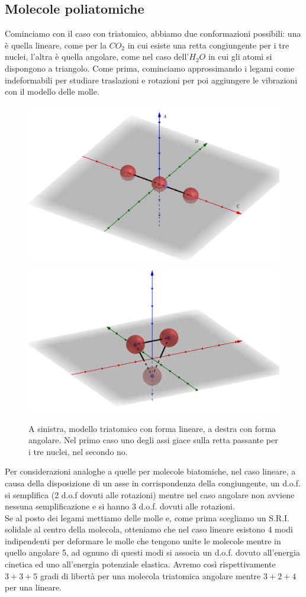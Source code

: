 \documentclass[
10pt, %
a4paper, %
oneside, %
headinclude,footinclude, %
BCOR5mm, %
]{scrartcl}
\begin{document}
\subsection{Molecole poliatomiche}
Cominciamo con il caso con triatomico, abbiamo due conformazioni possibili: una è quella lineare, come per la $CO_2$ in cui esiste una retta congiungente per i tre nuclei, l'altra è quella angolare, come nel caso dell'$H_2O$ in cui gli atomi si dispongono a triangolo. Come prima, cominciamo approssimando i legami come indeformabili per studiare traslazioni e rotazioni per poi aggiungere le vibrazioni con il modello delle molle.
\begin{figure}
	\centering
	\includegraphics[width=0.4\linewidth]{../images/modello_triatomico1} \quad
	\includegraphics[width=0.4\linewidth]{../images/modello_triatomico2}
	\caption{A sinistra, modello triatomico con forma lineare, a destra con forma angolare. Nel primo caso uno degli assi giace sulla retta passante per i tre nuclei, nel secondo no.}
\end{figure}
\FloatBarrier
Per considerazioni analoghe a quelle per molecole biatomiche, nel caso lineare, a causa della disposizione di un asse in corrispondenza della congiungente, un d.o.f. si semplifica (2 d.o.f dovuti alle rotazioni) mentre nel caso angolare non avviene nessuna semplificazione e si hanno 3 d.o.f. dovuti alle rotazioni.\\
Se al posto dei legami mettiamo delle molle e, come prima scegliamo un S.R.I. solidale al centro della molecola, otteniamo che nel caso lineare esistono 4 modi indipendenti per deformare le molle che tengono unite le molecole mentre in quello angolare 5, ad ognuno di questi modi  si associa un d.o.f. dovuto all'energia cinetica ed uno all'energia potenziale elastica. Avremo così rispettivamente $3+3+5$ gradi di libertà per una molecola triatomica angolare mentre $3+2+4$ per una lineare.
\end{document}
